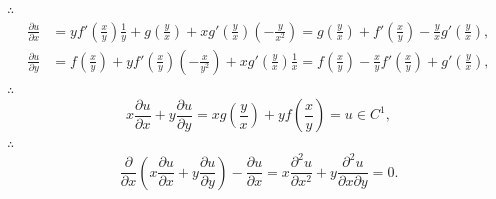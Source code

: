 \documentclass[12pt,UTF8]{ctexart}
\begin{document}
\begin{enumerate}
$\therefore$
\[\begin{split}
\frac{\partial u}{\partial x}&=yf'(\frac xy)\frac1y+g(\frac yx)+xg'(\frac yx)(-\frac y{x^2})=g(\frac yx)+f'(\frac xy)-\frac yxg'(\frac yx),\\
\frac{\partial u}{\partial y}&=f(\frac xy)+yf'(\frac xy)(-\frac x{y^2})+xg'(\frac yx)\frac1x=f(\frac xy)-\frac xyf'(\frac xy)+g'(\frac yx),
\end{split}\]
$\therefore$
\[
x\frac{\partial u}{\partial x}+y\frac{\partial u}{\partial y}=xg(\frac yx)+yf(\frac xy)=u\in C^1,
\]
$\therefore$
\[
\frac{\partial}{\partial x}(x\frac{\partial u}{\partial x}+y\frac{\partial u}{\partial y})-\frac{\partial u}{\partial x}=x\frac{\partial^2u}{\partial x^2}+y\frac{\partial^2u}{\partial x\partial y}=0.
\]
%
%
%
%
%
%
%
%
%
%
%
%
%
%
%
\end{enumerate}
\end{document}
